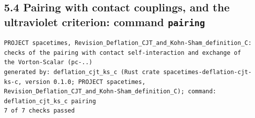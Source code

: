 \documentclass[
  10pt,
]{article}
\begin{document}
\hypertarget{pairing-with-contact-couplings-and-the-ultraviolet-criterion-command-pairing}{%
\subsection{\texorpdfstring{5.4 Pairing with contact couplings, and the
ultraviolet criterion: command
\texttt{pairing}}{5.4 Pairing with contact couplings, and the ultraviolet criterion: command pairing}}\label{pairing-with-contact-couplings-and-the-ultraviolet-criterion-command-pairing}}

\begin{verbatim}
PROJECT spacetimes, Revision_Deflation_CJT_and_Kohn-Sham_definition_C: checks of the pairing with contact self-interaction and exchange of the Vorton-Scalar (pc-..)
generated by: deflation_cjt_ks_c (Rust crate spacetimes-deflation-cjt-ks-c, version 0.1.0; PROJECT spacetimes, Revision_Deflation_CJT_and_Kohn-Sham_definition_C); command: deflation_cjt_ks_c pairing
7 of 7 checks passed


\end{verbatim}
\end{document}
